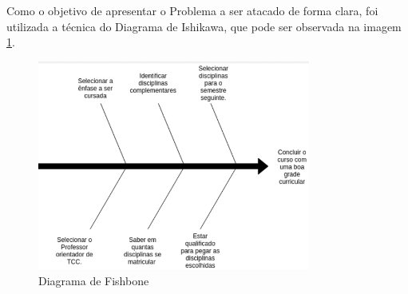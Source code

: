Como o objetivo de apresentar o Problema a ser atacado de forma clara, foi utilizada a técnica do Diagrama de Ishikawa, que pode ser observada na imagem \ref{img:fishbone}.

\begin{figure}[H]
	\centering
	\includegraphics[width=0.8\textwidth]{imagens/fishbone}
	\caption{Diagrama de Fishbone}
	\label{img:fishbone}
\end{figure}
